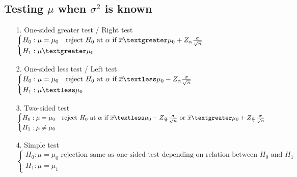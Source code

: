 \documentclass{article}
\begin{document}
\subsection{Testing $\mu$ when $\sigma^2$ is known}
\begin{itemize}
    \item [1.] One-sided greater test / Right test\\
    $\begin{cases}
        H_0:\mu =\mu_0 \quad \text{reject }H_0\text{ at }\alpha \text{ if } \overline{x}\textgreater \mu_0 + Z_{\alpha}\frac{\sigma}{\sqrt{n}}\\
        H_1:\mu \textgreater \mu_0
    \end{cases}$
    \item[2.] One-sided less test / Left test\\
    $\begin{cases}
        H_0:\mu =\mu_0 \quad \text{reject }H_0\text{ at }\alpha \text{ if } \overline{x}\textless \mu_0 - Z_{\alpha}\frac{\sigma}{\sqrt{n}}\\
        H_1:\mu \textless \mu_0
    \end{cases}$
    \item[3.] Two-sided test\\
    $\begin{cases}
        H_0:\mu =\mu_0 \quad \text{reject }H_0\text{ at }\alpha \text{ if } \overline{x}\textless \mu_0 - Z_{\frac{\alpha}{2}}\frac{\sigma}{\sqrt{n}} \text{ or }\overline{x}\textgreater \mu_0 + Z_{\frac{\alpha}{2}}\frac{\sigma}{\sqrt{n}}\\
        H_1:\mu \neq \mu_0
    \end{cases}$
    \item[4.] Simple test\\
    $\begin{cases}
        H_0: \mu=\mu_0 \text{ rejection same as one-sided test depending on relation between }H_0 \text{ and }H_1\\
        H_1:\mu =\mu_1
    \end{cases}$
\end{itemize}
\end{document}
